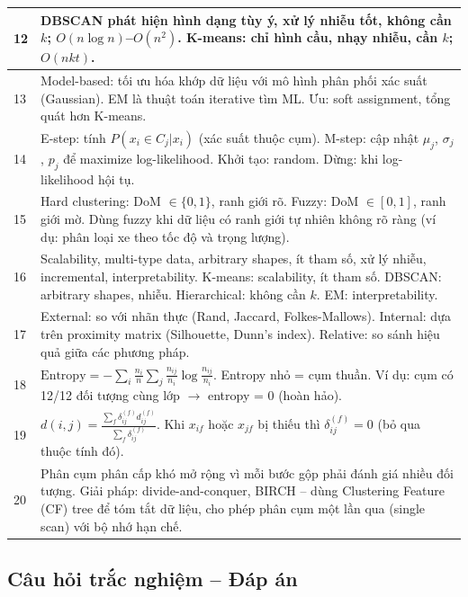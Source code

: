 \documentclass[10pt]{article}
\begin{document}
\begin{singlespace}
\begin{longtable}{|p{}|p{}|}
\hline
12 & DBSCAN phát hiện hình dạng tùy ý, xử lý nhiễu tốt, không cần $k$; $O(n\log n)$--$O(n^2)$. K-means: chỉ hình cầu, nhạy nhiễu, cần $k$; $O(nkt)$. \\
\hline
13 & Model-based: tối ưu hóa khớp dữ liệu với mô hình phân phối xác suất (Gaussian). EM là thuật toán iterative tìm ML. Ưu: soft assignment, tổng quát hơn K-means. \\
\hline
14 & E-step: tính $P(x_i \in C_j|x_i)$ (xác suất thuộc cụm). M-step: cập nhật $\mu_j$, $\sigma_j$, $p_j$ để maximize log-likelihood. Khởi tạo: random. Dừng: khi log-likelihood hội tụ. \\
\hline
15 & Hard clustering: DoM $\in \{0,1\}$, ranh giới rõ. Fuzzy: DoM $\in [0,1]$, ranh giới mờ. Dùng fuzzy khi dữ liệu có ranh giới tự nhiên không rõ ràng (ví dụ: phân loại xe theo tốc độ và trọng lượng). \\
\hline
16 & Scalability, multi-type data, arbitrary shapes, ít tham số, xử lý nhiễu, incremental, interpretability. K-means: scalability, ít tham số. DBSCAN: arbitrary shapes, nhiễu. Hierarchical: không cần $k$. EM: interpretability. \\
\hline
17 & External: so với nhãn thực (Rand, Jaccard, Folkes-Mallows). Internal: dựa trên proximity matrix (Silhouette, Dunn's index). Relative: so sánh hiệu quả giữa các phương pháp. \\
\hline
18 & $\text{Entropy} = -\sum_i \frac{n_i}{n}\sum_j \frac{n_{ij}}{n_i}\log\frac{n_{ij}}{n_i}$. Entropy nhỏ = cụm thuần. Ví dụ: cụm có 12/12 đối tượng cùng lớp $\to$ entropy = 0 (hoàn hảo). \\
\hline
19 & $d(i,j) = \frac{\sum_f \delta_{ij}^{(f)} d_{ij}^{(f)}}{\sum_f \delta_{ij}^{(f)}}$. Khi $x_{if}$ hoặc $x_{jf}$ bị thiếu thì $\delta_{ij}^{(f)} = 0$ (bỏ qua thuộc tính đó). \\
\hline
20 & Phân cụm phân cấp khó mở rộng vì mỗi bước gộp phải đánh giá nhiều đối tượng. Giải pháp: divide-and-conquer, BIRCH -- dùng Clustering Feature (CF) tree để tóm tắt dữ liệu, cho phép phân cụm một lần qua (single scan) với bộ nhớ hạn chế. \\
\hline
\end{longtable}
\end{singlespace}

\subsection*{Câu hỏi trắc nghiệm -- Đáp án}
\end{document}
